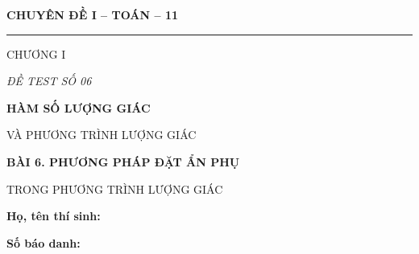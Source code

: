 \documentclass[12pt,a4paper]{article}
\begin{document}
\noindent
\begin{minipage}[t]{.35\textwidth}
  \centering
  {\bfseries CHUYÊN ĐỀ I -- TOÁN -- 11\par}
  \vspace{2pt}\rule{.72\linewidth}{.4pt}\par\vspace{3pt}
  CHƯƠNG I\par\vspace{4pt}
  {\itshape ĐỀ TEST SỐ 06\par}
\end{minipage}\hfill
\begin{minipage}[t]{.62\textwidth}
  \centering
  {\bfseries HÀM SỐ LƯỢNG GIÁC\par
  VÀ PHƯƠNG TRÌNH LƯỢNG GIÁC\par}
  \vspace{5pt}
  {\small\bfseries BÀI 6. PHƯƠNG PHÁP ĐẶT ẨN PHỤ\par
  TRONG PHƯƠNG TRÌNH LƯỢNG GIÁC\par}
\end{minipage}
\vspace{6mm}
\noindent
\begin{minipage}[t]{.72\textwidth}
  \textbf{Họ, tên thí sinh:}\dotfill\par
  \vspace{3pt}
  \textbf{Số báo danh:}\dotfill
\end{minipage}\hfill
\begin{minipage}[t]{.25\textwidth}
  \raggedleft\setlength{\fboxsep}{4pt}
\end{minipage}
\end{document}
